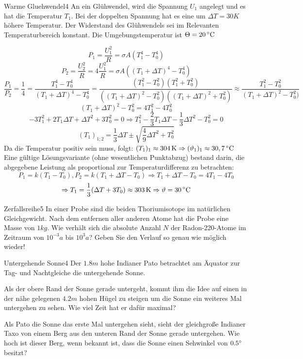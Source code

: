 



\begin{problem}{Warme Gluehwendel}{4}
An ein Glühwendel, wird die Spannung $U_1$ angelegt und es hat die Temperatur $T_1$. Bei der doppelten Spannung hat es eine um $\Delta T=30\unit{K}$ höhere Temperatur. Der Widerstand des Glühwendels sei im Relevanten Temperaturbereich konstant. Die Umgebungstemperatur ist $\Theta=20\,\mathrm{^\circ C}$
\begin{solution}
$$P_1=\frac{U_1^2}R=\sigma A (T_1^4 - T_0^4)$$
$$P_2=\frac{U_2^2}R=4\frac{U_1^2}R=\sigma A ((T_1+\Delta T)^4-T_0^4)$$
$$\frac{P_1}{P_2}=\frac 14=\frac{T_1^4-T_0^4}{(T_1+\Delta T)^4-T_0^4}=\frac{(T_1^2-T_0^2)(T_1^2+T_0^2)}{((T_1+\Delta T)^2-T_0^2)((T_1+\Delta T)^2+T_0^2)}\approx\frac{T_1^2-T_0^2}{(T_1+\Delta T)^2-T_0^2)}$$
$$(T_1+\Delta T)^2-T_0^2=4T_1^2-4T_0^2$$
$$-3T_1^2+2T_1\Delta T+\Delta T^2+3T_0^2=0 \Rightarrow T_1^2-\frac 23 T_1\Delta T-\frac 13 \Delta T^2-T_0^2=0$$
$$(T_1)_{1;2}=\frac 13\Delta T\pm\sqrt{\frac 49\Delta T^2+T_0^2}$$
Da die Temperatur positiv sein muss, folgt: $(T_1)_1\approx 304\,\mathrm{K} \Rightarrow (\vartheta_1)_1 \approx 30,7\,\mathrm{^\circ C}$
Eine gültige Lösungsvariante (ohne wesentlichen Punktabzug) bestand darin, die abgegebene Leistung als proportional zur Temperaturdifferenz zu betrachten:
$$P_1=k(T_1-T_0), P_2=k(T_1+\Delta T-T_0) \Rightarrow T_1+\Delta T-T_0=4T_1-4T_0$$
$$\Rightarrow T_1=\frac 13(\Delta T+3T_0)\approx 303\,\mathrm{K}\Rightarrow \vartheta=30\,\mathrm{^\circ C}$$
\end{solution}
\end{problem}

\begin{problem}{Zerfallsreihe}{5}
In einer Probe sind die beiden Thoriumisotope im natürlichen Gleichgewicht. Nach dem entfernen aller anderen Atome hat die Probe eine Masse von $1 \unit{kg}$. Wie verhält sich die absolute Anzahl $N$ der Radon-220-Atome im Zeitraum von $10^{-3}\unit{a}$ bis $10^3\unit{a}$? Geben Sie den Verlauf so genau wie möglich wieder!
\end{problem}

\begin{problem}{Untergehende Sonne}{4}
Der $1.8\unit{m}$ hohe Indianer Pato betrachtet am Äquator zur Tag- und Nachtgleiche die untergehende Sonne.
 \begin{abcenum}
  \item Als der obere Rand der Sonne gerade untergeht, kommt ihm die Idee auf einen in der nähe gelegenen $4.2 \unit{m}$ hohen Hügel zu steigen um die Sonne ein weiteres Mal untergehen zu sehen. Wie viel Zeit hat er dafür maximal?
  \item Als Pato die Sonne das erste Mal untergehen sieht, sieht der gleichgroße Indianer Taxo von einem Berg aus den unteren Rand der Sonne gerade untergehen. Wie hoch ist dieser Berg, wenn bekannt ist, dass die Sonne einen Sehwinkel von $0.5 ^\circ$ besitzt?
 \end{abcenum}
\end{problem}

